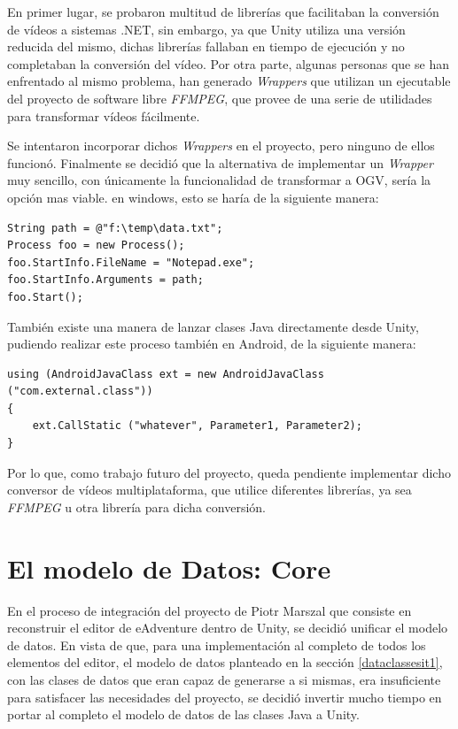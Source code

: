 En primer lugar, se probaron multitud de librerías que facilitaban la conversión de vídeos a sistemas .NET, sin embargo, ya que Unity utiliza una versión reducida del mismo, dichas librerías fallaban en tiempo de ejecución y no completaban la conversión del vídeo. Por otra parte, algunas personas que se han enfrentado al mismo problema, han generado \textit{Wrappers} que utilizan un ejecutable del proyecto de software libre \textit{FFMPEG}, que provee de una serie de utilidades para transformar vídeos fácilmente.

Se intentaron incorporar dichos \textit{Wrappers} en el proyecto, pero ninguno de ellos funcionó. Finalmente se decidió que la alternativa de implementar un \textit{Wrapper} muy sencillo, con únicamente la funcionalidad de transformar a OGV, sería la opción mas viable. en windows, esto se haría de la siguiente manera:

\begin{lstlisting}
String path = @"f:\temp\data.txt";
Process foo = new Process();
foo.StartInfo.FileName = "Notepad.exe";
foo.StartInfo.Arguments = path;
foo.Start();
\end{lstlisting}

También existe una manera de lanzar clases Java directamente desde Unity, pudiendo realizar este proceso también en Android, de la siguiente manera:

\begin{lstlisting}
using (AndroidJavaClass ext = new AndroidJavaClass ("com.external.class")) 
{
	ext.CallStatic ("whatever", Parameter1, Parameter2);
}
\end{lstlisting}

Por lo que, como trabajo futuro del proyecto, queda pendiente implementar dicho conversor de vídeos multiplataforma, que utilice diferentes librerías, ya sea \textit{FFMPEG} u otra librería para dicha conversión.

\section{El modelo de Datos: Core}

En el proceso de integración del proyecto de Piotr Marszal que consiste en reconstruir el editor de eAdventure dentro de Unity, se decidió unificar el modelo de datos. En vista de que, para una implementación al completo de todos los elementos del editor, el modelo de datos planteado en la sección \ref{dataclassesit1}, con las clases de datos que eran capaz de generarse a si mismas, era insuficiente para satisfacer las necesidades del proyecto, se decidió invertir mucho tiempo en portar al completo el modelo de datos de las clases Java a Unity.

